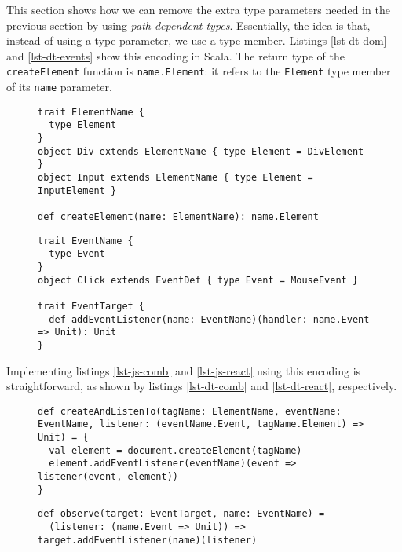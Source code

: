 \documentclass{llncs}
\newcommand{\scalacode}[1]{\lstinline[language=Scala]|#1|}
\begin{document}
This section shows how we can remove the extra type parameters needed in the previous section by using \emph{path-dependent types}. Essentially, the idea is that, instead of using a type parameter, we use a type member. Listings \ref{lst-dt-dom} and \ref{lst-dt-events} show this encoding in Scala. The return type of the \scalacode{createElement} function is \scalacode{name.Element}: it refers to the \scalacode{Element} type member of its \scalacode{name} parameter.

\begin{figure}
\begin{lstlisting}[label=lst-dt-dom]
trait ElementName {
  type Element
}
object Div extends ElementName { type Element = DivElement }
object Input extends ElementName { type Element = InputElement }

def createElement(name: ElementName): name.Element
\end{lstlisting}
\end{figure}


\begin{figure}
\begin{lstlisting}[label=lst-dt-events]
trait EventName {
  type Event
}
object Click extends EventDef { type Event = MouseEvent }

trait EventTarget {
  def addEventListener(name: EventName)(handler: name.Event => Unit): Unit
}
\end{lstlisting}
\end{figure}

Implementing listings \ref{lst-js-comb} and \ref{lst-js-react} using this encoding is straightforward, as shown by listings \ref{lst-dt-comb} and \ref{lst-dt-react}, respectively.

\begin{figure}
\begin{lstlisting}[label=lst-dt-comb]
def createAndListenTo(tagName: ElementName, eventName: EventName, listener: (eventName.Event, tagName.Element) => Unit) = {
  val element = document.createElement(tagName)
  element.addEventListener(eventName)(event => listener(event, element))
}
\end{lstlisting}
\end{figure}

\begin{figure}
\begin{lstlisting}[label=lst-dt-react]
def observe(target: EventTarget, name: EventName) =
  (listener: (name.Event => Unit)) => target.addEventListener(name)(listener)
\end{lstlisting}
\end{figure}
\end{document}
